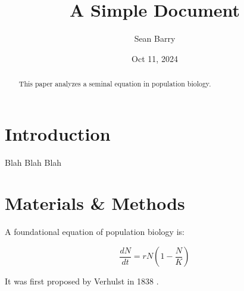 \documentclass[12pt]{article}
\title{A Simple Document}
\author{Sean Barry}
\date{Oct 11, 2024}
\begin{document}
  \maketitle
  
  \begin{abstract}
    This paper analyzes a seminal equation in population biology.
  \end{abstract}
  
  \section{Introduction}
    Blah Blah Blah
  
  \section{Materials \& Methods}
  
  A foundational equation of population biology is:
  
  \begin{equation}
    \frac{dN}{dt} = r N (1 - \frac{N}{K})
  \end{equation}
  
  It was first proposed by Verhulst in 1838 \cite{verhulst1838notice}.
  
  
  
  
\end{document}
